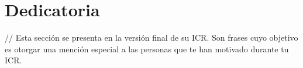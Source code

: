 \chapter*{Dedicatoria}
\begin{center}
    \thispagestyle{empty}
    \vspace*{\fill}
// Esta sección se presenta en la versión final de su ICR. Son frases cuyo objetivo es otorgar una mención especial a las personas que te han motivado durante tu ICR.
    \vspace*{\fill}
\end{center}